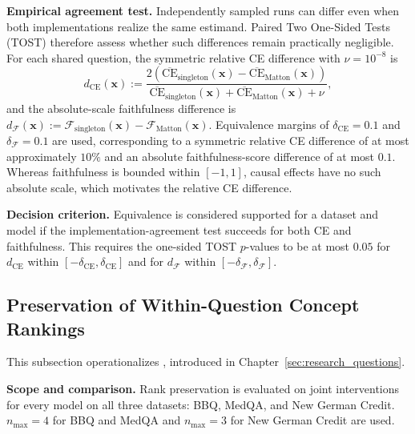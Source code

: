 \noindent\textbf{Empirical agreement test.} Independently sampled runs can differ even when both implementations realize the same estimand. Paired Two One-Sided Tests (TOST) therefore assess whether such differences remain practically negligible. For each shared question, the symmetric relative CE difference with $\nu = 10^{-8}$ is
\begin{equation}
	d_{\mathrm{CE}}(\mathbf{x}) :=
	\frac{2\left(\overline{\mathrm{CE}}_{\mathrm{singleton}}(\mathbf{x})-\overline{\mathrm{CE}}_{\mathrm{Matton}}(\mathbf{x})\right)}
	{\overline{\mathrm{CE}}_{\mathrm{singleton}}(\mathbf{x})+\overline{\mathrm{CE}}_{\mathrm{Matton}}(\mathbf{x})+\nu},
\end{equation}
and the absolute-scale faithfulness difference is $d_{\mathcal{F}}(\mathbf{x}):=\mathcal{F}_{\mathrm{singleton}}(\mathbf{x})-\mathcal{F}_{\mathrm{Matton}}(\mathbf{x})$. Equivalence margins of $\delta_{\mathrm{CE}}=0.1$ and $\delta_{\mathcal{F}}=0.1$ are used, corresponding to a symmetric relative CE difference of at most approximately $10\%$ and an absolute faithfulness-score difference of at most $0.1$. Whereas faithfulness is bounded within $[-1,1]$, causal effects have no such absolute scale, which motivates the relative CE difference.

\noindent\textbf{Decision criterion.} Equivalence is considered supported for a dataset and model if the implementation-agreement test succeeds for both CE and faithfulness. This requires the one-sided TOST $p$-values to be at most $0.05$ for $d_{\mathrm{CE}}$ within $[-\delta_{\mathrm{CE}},\delta_{\mathrm{CE}}]$ and for $d_{\mathcal{F}}$ within $[-\delta_{\mathcal{F}},\delta_{\mathcal{F}}]$.

\subsection{Preservation of Within-Question Concept Rankings}
\label{sec:methodology-preservation}
This subsection operationalizes , introduced in Chapter~\ref{sec:research_questions}.

\noindent\textbf{Scope and comparison.} Rank preservation is evaluated on joint interventions for every model on all three datasets: BBQ, MedQA, and New German Credit. $n_{\max}=4$ for BBQ and MedQA and $n_{\max}=3$ for New German Credit are used.


